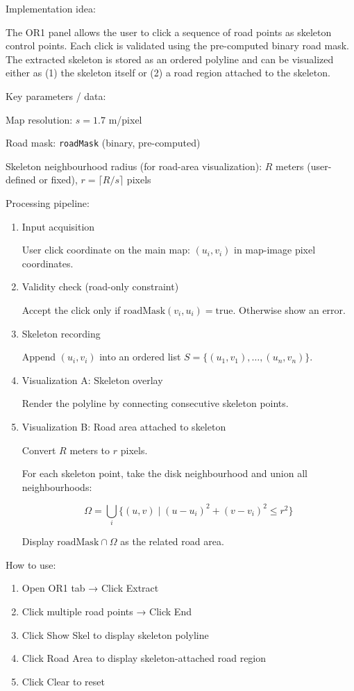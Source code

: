 \documentclass[12pt,a4paper]{ctexart}
\begin{document}
Implementation idea:

The OR1 panel allows the user to click a sequence of road points as skeleton control points. Each click is validated using the pre-computed binary road mask. The extracted skeleton is stored as an ordered polyline and can be visualized either as (1) the skeleton itself or (2) a road region attached to the skeleton.

Key parameters / data:

Map resolution: $s = 1.7$ m/pixel

Road mask: \texttt{roadMask} (binary, pre-computed)

Skeleton neighbourhood radius (for road-area visualization): $R$ meters (user-defined or fixed), $r = \lceil R/s \rceil$ pixels

Processing pipeline:

\begin{enumerate}
  \item Input acquisition

  User click coordinate on the main map: $(u_i, v_i)$ in map-image pixel coordinates.

  \item Validity check (road-only constraint)

  Accept the click only if $\text{roadMask}(v_i, u_i) = \text{true}$. Otherwise show an error.

  \item Skeleton recording

  Append $(u_i, v_i)$ into an ordered list $S = \{(u_1, v_1), \dots, (u_n, v_n)\}$.

  \item Visualization A: Skeleton overlay

  Render the polyline by connecting consecutive skeleton points.

  \item Visualization B: Road area attached to skeleton

  Convert $R$ meters to $r$ pixels.

  For each skeleton point, take the disk neighbourhood and union all neighbourhoods:

  \[
  \Omega = \bigcup_i \{(u,v)\mid (u-u_i)^2+(v-v_i)^2 \le r^2\}
  \]

  Display $\text{roadMask} \cap \Omega$ as the related road area.
\end{enumerate}

How to use:

\begin{enumerate}
  \item Open OR1 tab → Click Extract
  \item Click multiple road points → Click End
  \item Click Show Skel to display skeleton polyline
  \item Click Road Area to display skeleton-attached road region
  \item Click Clear to reset
\end{enumerate}
\end{document}
